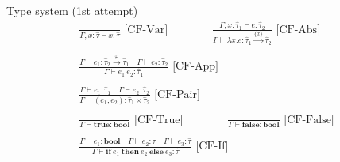 \documentclass{beamer}
\newcommand{\Abs}[2]{\lambda #1.#2}
\newcommand{\App}[2]{#1\ #2}
\newcommand{\Pair}[2]{\left(#1, #2\right)}
\newcommand{\BTrue}{\mathbf{true}}
\newcommand{\BFalse}{\mathbf{false}}
\newcommand{\ITE}[3]{\mathbf{if}\ #1\ \mathbf{then}\ #2\ \mathbf{else}\ #3}
\newcommand{\TBool}{\mathbf{bool}}
\newcommand{\AFun}[3]{#1 \xrightarrow{#2} #3}
\newcommand{\TPair}[2]{#1 \times #2}
\newcommand{\Rule}[3]{\frac{#2}{#3}\text{\ [#1]}}
\newcommand{\Judge}[3][\Gamma]{#1 \vdash #2 : #3}
\newcommand{\tauhat}{\widehat\tau}
\begin{document}
\begin{frame}{Type system (1st attempt)}
			\vspace{-2em}
			\begin{gather*}
				\Rule{CF-Var}
					 {}
					 {\Judge[\Gamma, x : \widehat\tau]{x}{\tauhat}}
				\quad\quad\quad\quad
				\Rule{CF-Abs}
					 {\Judge[\Gamma, x : \tauhat_1]{e}{\tauhat_2}}
					 {\Judge{\Abs{x}{e}}{\AFun{\tauhat_1}{\{x\}}{\tauhat_2}}}
				\\\\
				\Rule{CF-App}
				     {\Judge{e_1}{\AFun{\tauhat_2}{\varphi}{\tauhat_1}}\quad\Judge{e_2}{\tauhat_2}}
				     {\Judge{\App{e_1}{e_2}}{\tauhat_1}}
				\\\\
				\Rule{CF-Pair}
				     {\Judge{e_1}{\tauhat_1}\quad\Judge{e_2}{\tauhat_2}}
				     {\Judge{\Pair{e_1}{e_2}}{\TPair{\tauhat_1}{\tauhat_2}}}
			    \\\\
			    \Rule{CF-True}
			    	 {}
			    	 {\Judge{\BTrue}{\TBool}}
			    \quad\quad\quad\quad
			    \Rule{CF-False}
			    	 {}
			    	 {\Judge{\BFalse}{\TBool}}
			   	\\\\
			   	\Rule{CF-If}
			   		 {\Judge{e_1}{\TBool}\quad\Judge{e_2}{\tauhat}\quad\Judge{e_3}{\tauhat}}
			   		 {\Judge{\ITE{e_1}{e_2}{e_3}}{\tauhat}}
			\end{gather*}
\end{frame}
\end{document}
